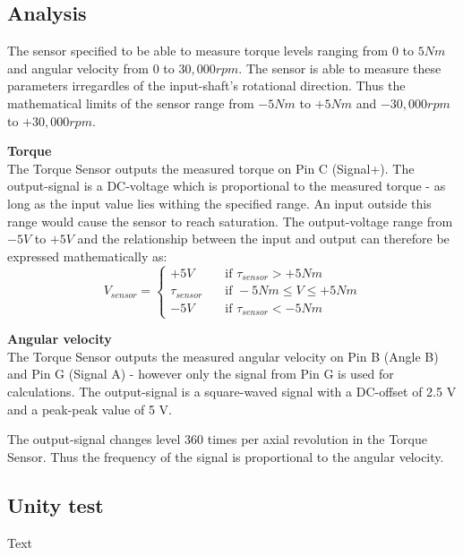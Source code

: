 \subsection{Analysis}
The sensor specified to be able to measure torque levels ranging from $0$ to $5 Nm$ and angular velocity from $0$ to $30,000 rpm$. The sensor is able to measure these parameters irregardles of the input-shaft's rotational direction. Thus the mathematical limits of the sensor range from $-5 Nm$ to $+5 Nm$ and $-30,000 rpm$ to $+30,000 rpm$.

\textbf{Torque}\\
The Torque Sensor outputs the measured torque on Pin C (Signal+). The output-signal is a DC-voltage which is proportional to the measured torque - as long as the input value lies withing the specified range. An input outside this range would cause the sensor to reach saturation. The output-voltage range from $-5 V$ to $+5 V$ and the relationship between the input and output can therefore be expressed mathematically as:
\begin{equation}
	V_{sensor} = 
	\begin{cases}
		+5V				& \quad \text{if } \tau_{sensor} > +5 Nm\\
		\tau_{sensor}   & \quad \text{if } -5 Nm \leq V \leq +5 Nm\\
		-5V				& \quad \text{if } \tau_{sensor} < -5 Nm
	\end{cases}
\end{equation}

\textbf{Angular velocity}\\
The Torque Sensor outputs the measured angular velocity on Pin B (Angle B) and Pin G (Signal A) - however only the signal from Pin G is used for calculations. The output-signal is a square-waved signal with a DC-offset of 2.5 V and a peak-peak value of 5 V.

The output-signal changes level 360 times per axial revolution in the Torque Sensor. Thus the frequency of the signal is proportional to the angular velocity.

\subsection{Unity test}
Text
